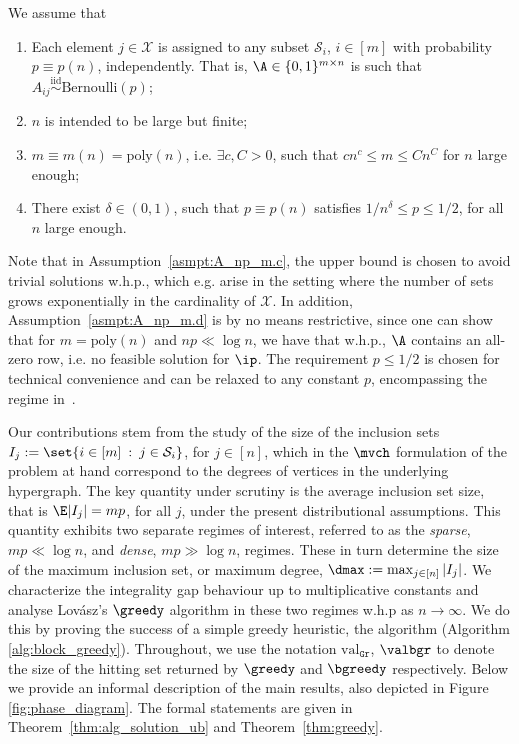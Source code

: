 \begin{assumption}\label{asmpt:A_np_m}We assume that
\begin{enumerate}[ref={\theassumption.\arabic*}]
    \item Each element $j\in \mathcal{X}$ is assigned to any subset $\mathcal{S}_i$, $i \in [m]$ with probability $p \equiv p(n)$, independently. That is, $\A \in \{0, 1\}^{m \times n}$ is such that $A_{ij} \overset{\text{iid}}{\sim} \mathrm{Bernoulli}(p)$; 
    \item $n$ is intended to be large but finite;
    \item \(m \equiv m(n) = \mathrm{poly}(n)\), i.e. $\exists c, C > 0$, such that $c n^c \leq m \leq Cn^C$ for $n$ large enough; \label{asmpt:A_np_m.c}
    \item There exist $\delta \in (0,1)$, such that \(p \equiv p(n)\) satisfies \(1/n^{\delta} \leq p \leq 1/2\), for all \(n\) large enough.
\label{asmpt:A_np_m.d}
\end{enumerate}
\end{assumption}
\noindent
Note that in Assumption~\ref{asmpt:A_np_m.c}, the upper bound is chosen to avoid trivial solutions w.h.p., which e.g. arise in the setting where the number of sets grows exponentially in the cardinality of $\mathcal{X}$.  In addition, Assumption~\ref{asmpt:A_np_m.d} is by no means restrictive, since one can show that for $m = \text{poly}(n)$ and \(np \ll \log n\), we have that w.h.p., $\A$ contains an all-zero row, i.e. no feasible solution for $\ip$. The requirement \(p \leq 1/2\) is chosen for technical convenience and can be relaxed to any constant \(p\), encompassing the regime in~\cite{iliopoulos2021group}.\\


\noindent

\noindent
Our contributions stem from the study of the size of the inclusion sets $I_j := \set{i \in [m]\: : \: j \in \mathcal{S}_i}$, for $j \in [n]$, which in the \(\mvch\) formulation of the problem at hand correspond to the degrees of vertices in the underlying hypergraph. The key quantity under scrutiny is the average inclusion set size, that is $\E |I_j| = mp$, for all $j$, under the present distributional assumptions. This quantity exhibits two separate regimes of interest, referred to as the \emph{sparse}, $mp \ll \log{n}$, and \emph{dense}, $mp \gg \log{n}$, regimes. These in turn determine the size of the maximum inclusion set, or maximum degree, $\dmax := \max_{j \in [n]} |I_j|$. We characterize the integrality gap behaviour up to multiplicative constants and analyse Lovász's $\greedy$ algorithm \cite{lovasz1975ratio} in these two regimes w.h.p as $n \to \infty$. We do this by proving the success of a simple greedy heuristic, the \bgreedy algorithm (Algorithm \ref{alg:block_greedy}). Throughout, we use the notation $\text{val}_{\mathtt{Gr}}$, $\valbgr$ to denote the size of the hitting set returned by $\greedy$ and $\bgreedy$ respectively. Below we provide an informal description of the main results, also depicted in Figure \ref{fig:phase_diagram}. The formal statements are given in Theorem~\ref{thm:alg_solution_ub} and Theorem~\ref{thm:greedy}.
\\

